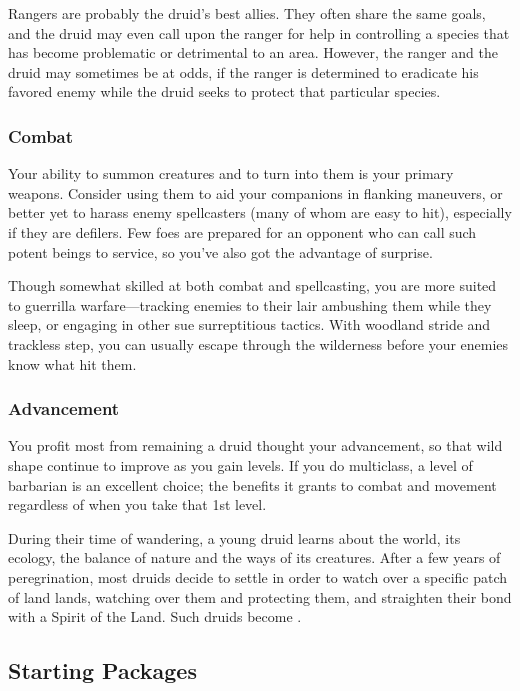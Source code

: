 Rangers are probably the druid's best allies. They often share the same goals, and the druid may even call upon the ranger for help in controlling a species that has become problematic or detrimental to an area. However, the ranger and the druid may sometimes be at odds, if the ranger is determined to eradicate his favored enemy while the druid seeks to protect that particular species.

\subsubsection{Combat}
Your ability to summon creatures and to turn into them is your primary weapons. Consider using them to aid your companions in flanking maneuvers, or better yet to harass enemy spellcasters (many of whom are easy to hit), especially if they are defilers. Few foes are prepared for an opponent who can call such potent beings to service, so you've also got the advantage of surprise.

Though somewhat skilled at both combat and spellcasting, you are more suited to guerrilla warfare---tracking enemies to their lair ambushing them while they sleep, or engaging in other sue surreptitious tactics. With woodland stride and trackless step, you can usually escape through the wilderness before your enemies know what hit them.

\subsubsection{Advancement}

You profit most from remaining a druid thought your advancement, so that %
wild shape continue to improve as you gain levels. If you do multiclass, a level of barbarian is an excellent choice; the benefits it grants to combat and movement regardless of when you take that 1st level.

During their time of wandering, a young druid learns about the world, its ecology, the balance of nature and the ways of its creatures. After a few years of peregrination, most druids decide to settle in order to watch over a specific patch of land lands, watching over them and protecting them, and straighten their bond with a Spirit of the Land. Such druids become .

\subsection{Starting Packages}

